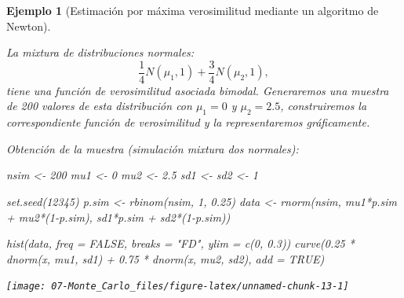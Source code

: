 \documentclass[
  10pt,
]{book}
\newenvironment{Shaded}{\begin{snugshade}}{\end{snugshade}}
\newcommand{\AttributeTok}[1]{\textcolor[rgb]{0.77,0.63,0.00}{#1}}
\newcommand{\ConstantTok}[1]{\textcolor[rgb]{0.00,0.00,0.00}{#1}}
\newcommand{\DecValTok}[1]{\textcolor[rgb]{0.00,0.00,0.81}{#1}}
\newcommand{\FloatTok}[1]{\textcolor[rgb]{0.00,0.00,0.81}{#1}}
\newcommand{\FunctionTok}[1]{\textcolor[rgb]{0.00,0.00,0.00}{#1}}
\newcommand{\NormalTok}[1]{#1}
\newcommand{\OtherTok}[1]{\textcolor[rgb]{0.56,0.35,0.01}{#1}}
\newcommand{\SpecialCharTok}[1]{\textcolor[rgb]{0.00,0.00,0.00}{#1}}
\newcommand{\StringTok}[1]{\textcolor[rgb]{0.31,0.60,0.02}{#1}}
\theoremstyle{break}
\newtheorem{example}{Ejemplo}[chapter]
\theoremstyle{nonumberplain}
\begin{document}
\begin{example}[Estimación por máxima verosimilitud mediante un algoritmo de Newton]
\protect\hypertarget{exm:mv-nlm}{}\label{exm:mv-nlm}

La mixtura de distribuciones normales:
\[\frac1{4}N(\mu_1,1)+\frac{3}{4}N(\mu_2,1),\]
tiene una función de verosimilitud asociada bimodal.
Generaremos una muestra de 200 valores de esta distribución con \(\mu_1=0\) y \(\mu_2=2.5\), construiremos la correspondiente función de verosimilitud y la representaremos gráficamente.

Obtención de la muestra (simulación mixtura dos normales):

\begin{Shaded}
\begin{Highlighting}[]
\NormalTok{nsim }\OtherTok{\textless{}{-}} \DecValTok{200}
\NormalTok{mu1 }\OtherTok{\textless{}{-}} \DecValTok{0} 
\NormalTok{mu2 }\OtherTok{\textless{}{-}} \FloatTok{2.5}
\NormalTok{sd1 }\OtherTok{\textless{}{-}}\NormalTok{ sd2 }\OtherTok{\textless{}{-}} \DecValTok{1}

\FunctionTok{set.seed}\NormalTok{(}\DecValTok{12345}\NormalTok{)}
\NormalTok{p.sim }\OtherTok{\textless{}{-}} \FunctionTok{rbinom}\NormalTok{(nsim, }\DecValTok{1}\NormalTok{, }\FloatTok{0.25}\NormalTok{)}
\NormalTok{data }\OtherTok{\textless{}{-}} \FunctionTok{rnorm}\NormalTok{(nsim, mu1}\SpecialCharTok{*}\NormalTok{p.sim }\SpecialCharTok{+}\NormalTok{ mu2}\SpecialCharTok{*}\NormalTok{(}\DecValTok{1}\SpecialCharTok{{-}}\NormalTok{p.sim), sd1}\SpecialCharTok{*}\NormalTok{p.sim }\SpecialCharTok{+}\NormalTok{ sd2}\SpecialCharTok{*}\NormalTok{(}\DecValTok{1}\SpecialCharTok{{-}}\NormalTok{p.sim))}

\FunctionTok{hist}\NormalTok{(data, }\AttributeTok{freq =} \ConstantTok{FALSE}\NormalTok{, }\AttributeTok{breaks =} \StringTok{"FD"}\NormalTok{, }\AttributeTok{ylim =} \FunctionTok{c}\NormalTok{(}\DecValTok{0}\NormalTok{, }\FloatTok{0.3}\NormalTok{))}
\FunctionTok{curve}\NormalTok{(}\FloatTok{0.25} \SpecialCharTok{*} \FunctionTok{dnorm}\NormalTok{(x, mu1, sd1) }\SpecialCharTok{+} \FloatTok{0.75} \SpecialCharTok{*} \FunctionTok{dnorm}\NormalTok{(x, mu2, sd2), }\AttributeTok{add =} \ConstantTok{TRUE}\NormalTok{)}
\end{Highlighting}
\end{Shaded}

\begin{center}\texttt{[image: 07-Monte\_Carlo\_files/figure-latex/unnamed-chunk-13-1]} \end{center}


\end{example}
\end{document}
